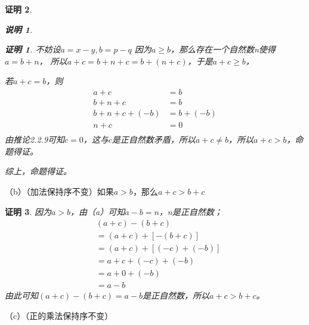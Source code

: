 \documentclass{article}
\theoremstyle{mystyle}
\newtheorem*{zremark}{说明}
\theoremstyle{zproofstyle}
\newtheorem*{zproof}{证明}
\begin{document}
\begin{zproof}
\begin{zgraytheorem}
\begin{zremark}
      \begin{zproof}
        不妨设$a=x-y,b=p-q$
        因为$a \geq b$，那么存在一个自然数n使得$a = b + n$，
        所以$a + c = b + n + c = b + (n + c)$，于是$a + c \geq b$，

        若$a+c=b$，则
        \begin{align*}
          a + c            & = b        \\
          b + n + c        & = b        \\
          b + n + c + (-b) & = b + (-b) \\
          n + c            & = 0        \\
        \end{align*}
        由推论2.2.9可知$c=0$，这与$c$是正自然数矛盾，所以$a+c \neq b$，所以$a + c > b$，命题得证。
      \end{zproof}
    \end{zremark}
  \end{zgraytheorem}

  综上，命题得证。
\end{zproof}

（b）（加法保持序不变）如果$a > b$，那么$a + c > b + c$

\begin{zproof}
  因为$a>b$，由（a）可知$a-b=n$，n是正自然数；
  \begin{align*}
     & (a+c) - (b+c)        \\
     & =(a+c) + [-(b+c)]    \\
     & =(a+c) + [(-c)+(-b)] \\
     & =a + c + (-c) + (-b) \\
     & =a + 0 + (-b)        \\
     & =a - b
  \end{align*}
  由此可知$(a+c) - (b+c)=a - b$是正自然数，所以$a + c > b + c$。
\end{zproof}

（c）（正的乘法保持序不变）
\end{document}
